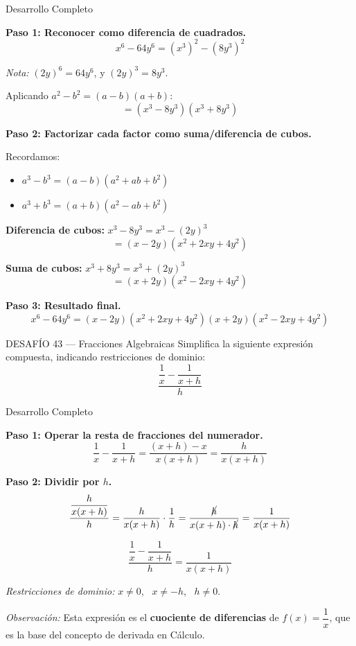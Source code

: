 \documentclass[letterpaper, 12pt]{article}
\begin{document}
\begin{solucionbox}{Desarrollo Completo}

\textbf{Paso 1: Reconocer como diferencia de cuadrados.}
\[
    x^6 - 64y^6 = (x^3)^2 - (8y^3)^2
\]

\textit{Nota:} $(2y)^6 = 64y^6$, y $(2y)^3 = 8y^3$.

Aplicando $a^2 - b^2 = (a - b)(a + b)$:
\[
    = (x^3 - 8y^3)(x^3 + 8y^3)
\]

\textbf{Paso 2: Factorizar cada factor como suma/diferencia de cubos.}

Recordamos:
\begin{itemize}
    \item $a^3 - b^3 = (a - b)(a^2 + ab + b^2)$
    \item $a^3 + b^3 = (a + b)(a^2 - ab + b^2)$
\end{itemize}

\textbf{Diferencia de cubos:} $x^3 - 8y^3 = x^3 - (2y)^3$
\[
    = (x - 2y)(x^2 + 2xy + 4y^2)
\]

\textbf{Suma de cubos:} $x^3 + 8y^3 = x^3 + (2y)^3$
\[
    = (x + 2y)(x^2 - 2xy + 4y^2)
\]

\textbf{Paso 3: Resultado final.}
\[\boxed{x^6 - 64y^6 = (x - 2y)(x^2 + 2xy + 4y^2)(x + 2y)(x^2 - 2xy + 4y^2)}\]
\end{solucionbox}

\vspace{0.6cm}

\begin{desafiobox}{DESAFÍO 43 — Fracciones Algebraicas}
Simplifica la siguiente expresión compuesta, indicando restricciones de dominio:
\[
    \frac{\dfrac{1}{x} - \dfrac{1}{x+h}}{h}
\]
\end{desafiobox}

\begin{solucionbox}{Desarrollo Completo}

\textbf{Paso 1: Operar la resta de fracciones del numerador.}
\[
    \frac{1}{x} - \frac{1}{x+h} = \frac{(x+h) - x}{x(x+h)} = \frac{h}{x(x+h)}
\]

\textbf{Paso 2: Dividir por $h$.}
\[
    \frac{\dfrac{h}{x(x+h)}}{h} = \frac{h}{x(x+h)} \cdot \frac{1}{h} = \frac{\cancel{h}}{x(x+h) \cdot \cancel{h}} = \frac{1}{x(x+h)}
\]

\[\boxed{\frac{\dfrac{1}{x} - \dfrac{1}{x+h}}{h} = \frac{1}{x(x+h)}}\]

\textit{Restricciones de dominio:} $x \neq 0$, \ $x \neq -h$, \ $h \neq 0$.

\vspace{0.2cm}
\textit{Observación:} Esta expresión es el \textbf{cuociente de diferencias} de $f(x) = \dfrac{1}{x}$, que es la base del concepto de derivada en Cálculo.
\end{solucionbox}
\end{document}
